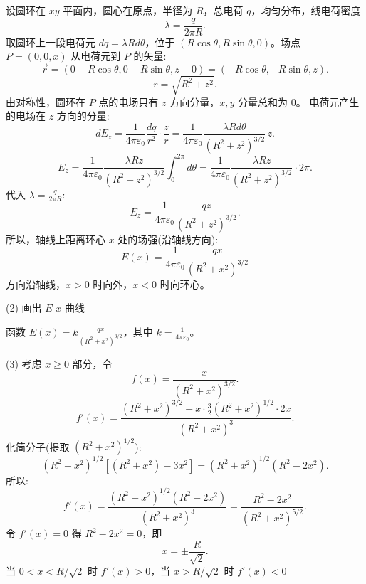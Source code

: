 \documentclass{article}
\begin{document}
设圆环在 $ xy $ 平面内，圆心在原点，半径为 $ R $，总电荷 $ q $，均匀分布，线电荷密度  
$$\lambda = \frac{q}{2\pi R}.$$
取圆环上一段电荷元 $ dq = \lambda R d\theta $，位于 $ (R\cos\theta, R\sin\theta, 0) $。场点 $ P = (0, 0, x) $
从电荷元到 $ P $ 的矢量:
$$\vec{r} = (0 - R\cos\theta, 0 - R\sin\theta, z - 0) = (-R\cos\theta, -R\sin\theta, z).$$
$$r = \sqrt{R^2 + z^2}.$$
由对称性，圆环在 $ P $ 点的电场只有 $ z $ 方向分量，$ x, y $ 分量总和为 0。
电荷元产生的电场在 $ z $ 方向的分量:
$$dE_z = \frac{1}{4\pi\varepsilon_0} \frac{dq}{r^2} \cdot \frac{z}{r}= \frac{1}{4\pi\varepsilon_0} \frac{\lambda R d\theta}{(R^2 + z^2)^{3/2}} \, z.$$
$$E_z = \frac{1}{4\pi\varepsilon_0} \frac{\lambda R z}{(R^2 + z^2)^{3/2}} \int_0^{2\pi} d\theta= \frac{1}{4\pi\varepsilon_0} \frac{\lambda R z}{(R^2 + z^2)^{3/2}} \cdot 2\pi.$$
代入 $ \lambda = \frac{q}{2\pi R} $:
$$E_z = \frac{1}{4\pi\varepsilon_0} \frac{q z}{(R^2 + z^2)^{3/2}}.$$
所以，轴线上距离环心 $ x $ 处的场强(沿轴线方向):
$$E(x) = \frac{1}{4\pi\varepsilon_0} \frac{q x}{(R^2 + x^2)^{3/2}}$$
方向沿轴线，$ x>0 $ 时向外，$ x<0 $ 时向环心。

 (2) 画出 $ E $-$ x $ 曲线

函数 $ E(x) = k \frac{q x}{(R^2 + x^2)^{3/2}} $，其中 $ k = \frac{1}{4\pi\varepsilon_0} $。





(3) 考虑 $ x \ge 0 $ 部分，令
$$f(x) = \frac{x}{(R^2 + x^2)^{3/2}}.$$
$$f'(x) = \frac{(R^2 + x^2)^{3/2} - x \cdot \frac{3}{2}(R^2 + x^2)^{1/2} \cdot 2x}{(R^2 + x^2)^3}.$$
化简分子(提取 $ (R^2 + x^2)^{1/2} $):
$$(R^2 + x^2)^{1/2} \left[ (R^2 + x^2) - 3x^2 \right] = (R^2 + x^2)^{1/2} (R^2 - 2x^2).$$
所以:
$$f'(x) = \frac{(R^2 + x^2)^{1/2} (R^2 - 2x^2)}{(R^2 + x^2)^3}= \frac{R^2 - 2x^2}{(R^2 + x^2)^{5/2}}.$$
令 $ f'(x) = 0 $ 得 $ R^2 - 2x^2 = 0 $，即
$$x = \pm \frac{R}{\sqrt{2}}.$$
当 $ 0 < x < R/\sqrt{2} $ 时 $ f'(x) > 0 $，当 $ x > R/\sqrt{2} $ 时 $ f'(x) < 0 $
\end{document}

